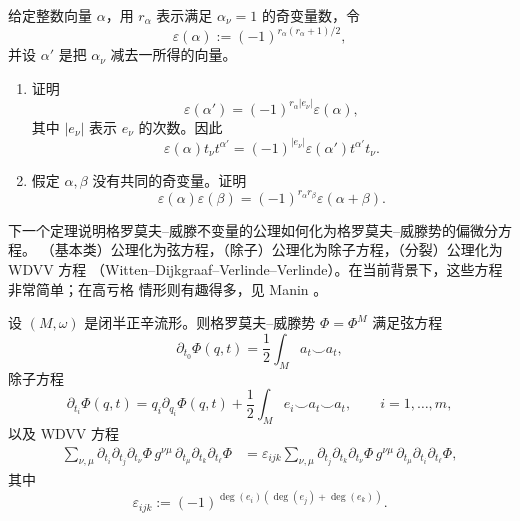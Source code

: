 \begin{exercise}\label{ex:11-2-3}
给定整数向量 $\alpha$，用 $r_\alpha$ 表示满足 $\alpha_\nu=1$ 的奇变量数，令
\[
  \varepsilon(\alpha):=(-1)^{r_\alpha(r_\alpha+1)/2},
\]
并设 $\alpha'$ 是把 $\alpha_\nu$ 减去一所得的向量。
\begin{enumerate}[label=\textnormal{(\roman*)}]
\item 证明
\[
  \varepsilon(\alpha')
  =(-1)^{r_\alpha|e_\nu|}\varepsilon(\alpha),
\]
其中 $|e_\nu|$ 表示 $e_\nu$ 的次数。因此
\[
  \varepsilon(\alpha)t_\nu t^{\alpha'}
  =(-1)^{|e_\nu|}\varepsilon(\alpha')t^{\alpha'}t_\nu.
\]
\item 假定 $\alpha,\beta$ 没有共同的奇变量。证明
\[
  \varepsilon(\alpha)\varepsilon(\beta)
  =(-1)^{r_\alpha r_\beta}\varepsilon(\alpha+\beta).
\]
\end{enumerate}
\end{exercise}

下一个定理说明格罗莫夫--威滕不变量的公理如何化为格罗莫夫--威滕势的偏微分方程。
（基本类）公理化为弦方程，（除子）公理化为除子方程，（分裂）公理化为 WDVV 方程
（Witten--Dijkgraaf--Verlinde--Verlinde）。在当前背景下，这些方程非常简单；在高亏格
情形则有趣得多，见 Manin 。

\begin{theorem}\label{thm:11-2-4}
设 $(M,\omega)$ 是闭半正辛流形。则格罗莫夫--威滕势 $\Phi=\Phi^M$ 满足弦方程
\begin{equation}\label{eq:11-2-9}
  \partial_{t_0}\Phi(q,t)=\frac12\int_Ma_t\smile a_t,
\end{equation}
除子方程
\begin{equation}\label{eq:11-2-10}
  \partial_{t_i}\Phi(q,t)
  =q_i\partial_{q_i}\Phi(q,t)
  +\frac12\int_Me_i\smile a_t\smile a_t,
  \qquad i=1,\ldots,m,
\end{equation}
以及 WDVV 方程
\begin{equation}\label{eq:11-2-11}
\begin{aligned}
  \sum_{\nu,\mu}
  \partial_{t_i}\partial_{t_j}\partial_{t_\nu}\Phi\,
  g^{\nu\mu}\,
  \partial_{t_\mu}\partial_{t_k}\partial_{t_\ell}\Phi
  &=
  \varepsilon_{ijk}\sum_{\nu,\mu}
  \partial_{t_j}\partial_{t_k}\partial_{t_\nu}\Phi\,
  g^{\nu\mu}\,
  \partial_{t_\mu}\partial_{t_i}\partial_{t_\ell}\Phi,
\end{aligned}
\end{equation}
其中
\[
  \varepsilon_{ijk}:=
  (-1)^{\deg(e_i)(\deg(e_j)+\deg(e_k))}.
\]
\end{theorem}

